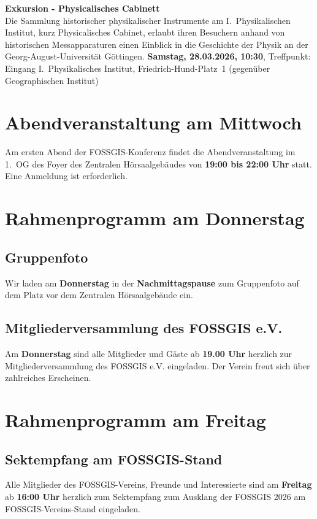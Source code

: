 \noindent
{\large \bfseries Exkursion - Physicalisches Cabinett}\\
Die Sammlung historischer physikalischer Instrumente am I.~Physikalischen Institut, kurz Physicalisches Cabinet, erlaubt ihren Besuchern anhand von historischen Messapparaturen einen Einblick in die Geschichte der Physik an der Georg-August-Universität Göttingen.
{\bfseries Samstag, 28.03.2026, 10:30}, Treffpunkt: Eingang I.~Physikalisches Institut,
Friedrich-Hund-Platz~1 (gegenüber Geographischen Institut)

\newpage
\section*{Abendveranstaltung am Mittwoch}\label{schwaetzli}
Am ersten Abend der FOSSGIS-Konferenz findet die Abendveranstaltung im 1.~OG des  Foyer des Zentralen Hörsaalgebäudes von {\bfseries 19:00 bis 22:00 Uhr} statt. Eine Anmeldung ist erforderlich.
\bigskip



\section*{Rahmenprogramm am Donnerstag}
\subsection*{Gruppenfoto}
Wir laden am {\bfseries Donnerstag} in der {\bfseries Nachmittagspause} zum Gruppenfoto auf dem Platz vor dem Zentralen Hörsaalgebäude ein.

\subsection*{Mitgliederversammlung des FOSSGIS e.V.}
Am {\bfseries Donnerstag} sind alle Mitglieder und Gäste ab {\bfseries 19.00 Uhr} herzlich zur Mitgliederversammlung des FOSSGIS e.V. eingeladen.  Der Verein freut sich über zahlreiches Erscheinen.

\newpage
\section*{Rahmenprogramm am Freitag}

\subsection*{Sektempfang am FOSSGIS-Stand}
Alle Mitglieder des FOSSGIS-Vereins, Freunde und Interessierte sind am {\bfseries Freitag} ab {\bfseries 16:00 Uhr} herzlich zum Sektempfang zum Ausklang der FOSSGIS 2026 am FOSSGIS-Vereins-Stand eingeladen.

